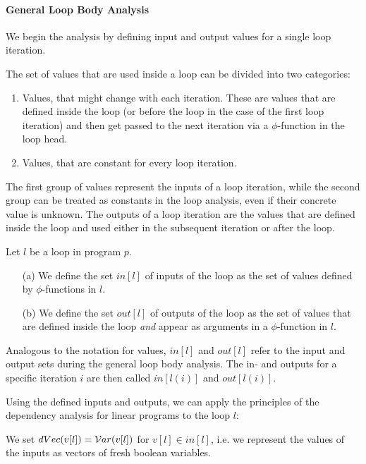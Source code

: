 \paragraph{General Loop Body Analysis}
We begin the analysis by defining input and output values for a single loop iteration. 

The set of values that are used inside a loop can be divided into two categories:
\begin{enumerate}
    \item Values, that might change with each iteration. These are values that are defined inside the loop (or before the loop in the case of the first loop iteration) and then get passed to the next iteration via a $\phi$-function in the loop head.
    \item Values, that are constant for every loop iteration.
\end{enumerate}

The first group of values represent the inputs of a loop iteration, while the second group can be treated as constants in the loop analysis, even if their concrete value is unknown. The outputs of a loop iteration are the values that are defined inside the loop and used either in the subsequent iteration or after the loop.

\begin{definition}
    Let $l$ be a loop in program $p$.
    \begin{itemize}
        \item[(a)] We define the set $in[l]$ of inputs of the loop as the set of values defined by $\phi$-functions in $l$.
        \item[(b)] We define the set $out[l]$ of outputs of the loop as the set of values that are defined inside the loop \emph{and} appear as arguments in a $\phi$-function in $l$.
    \end{itemize}
\end{definition}

Analogous to the notation for values, $in[l]$ and $out[l]$ refer to the input and output sets during the general loop body analysis. The in- and outputs for a specific iteration $i$ are then called $in[l(i)]$ and $out[l(i)]$.

Using the defined inputs and outputs, we can apply the principles of the dependency analysis for linear programs to the loop $l$:

We set $dVec(v[l]) = \mathcal{V}ar(v[l])$ for $v[l] \in in[l]$, i.e. we represent the values of the inputs as vectors of fresh boolean variables.

